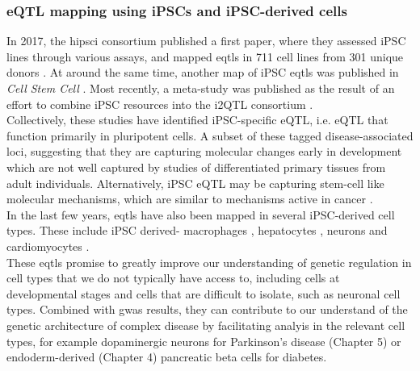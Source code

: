 \subsubsection{eQTL mapping using iPSCs and iPSC-derived cells}

In 2017, the \gls{hipsci} consortium published a first paper, where they assessed iPSC lines through various assays, and mapped \glspl{eqtl} in 711 cell lines from 301 unique donors \cite{kilpinen2017common}.
At around the same time, another map of iPSC \glspl{eqtl} was published in \textit{Cell Stem Cell} \cite{deboever2017large}.
Most recently, a meta-study was published as the result of an effort to combine iPSC resources into the i2QTL consortium \cite{bonder2019systematic}.\\

Collectively, these studies have identified iPSC-specific eQTL, i.e. eQTL that function primarily in pluripotent cells.
A subset of these tagged disease-associated loci, suggesting that they are capturing molecular changes early in development which are not well captured by studies of differentiated primary tissues from adult individuals. 
Alternatively, iPSC eQTL may be capturing stem-cell like molecular mechanisms, which are similar to mechanisms active in cancer \cite{kilpinen2017common}. \\


In the last few years, \glspl{eqtl} have also been mapped in several iPSC-derived cell types.
These include iPSC derived-
macrophages \cite{alasoo2018shared},
hepatocytes \cite{pashos2017large},
neurons \cite{schwartzentruber2018molecular}
and
cardiomyocytes \cite{strober2019dynamic, banovich2018impact}.\\

These \glspl{eqtl} promise to greatly improve our understanding of genetic regulation in cell types that we do not typically have access to, including cells at developmental stages and cells that are difficult to isolate, such as neuronal cell types.
Combined with \gls{gwas} results, they can contribute to our understand of the genetic architecture of complex disease by facilitating analyis in the relevant cell types, for example dopaminergic neurons for Parkinson's disease (Chapter
5)
or endoderm-derived (Chapter 
4)
pancreatic beta cells for diabetes.


